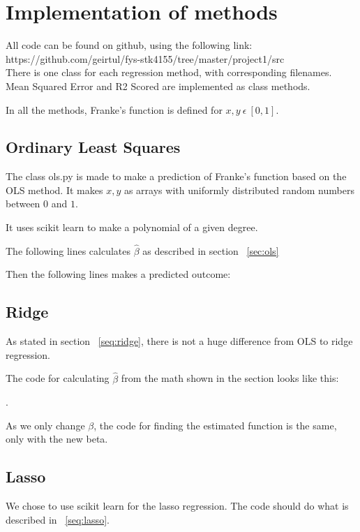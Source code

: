 \section{Implementation of methods}
All code can be found on github, using the following link:\\ 
https://github.com/geirtul/fys-stk4155/tree/master/project1/src\\

There is one class for each regression method, with corresponding 
filenames. Mean Squared Error and R2 Scored are implemented as class methods.

In all the methods, Franke's function is defined for 
\(x,y \ \epsilon \ [0,1]\).

\subsection{Ordinary Least Squares}
The class ols.py is made to make a prediction of Franke's function
based on the OLS method. 
It makes \(x, y\) as arrays with uniformly distributed random numbers 
between \(0\) and \(1\). 

It uses scikit learn to make a polynomial of a given degree. 

The following lines calculates \(\hat{\beta}\) as described in 
section ~\ref{sec:ols} 



Then the following lines makes a predicted outcome:



\subsection{Ridge}
As stated in section ~\ref{seq:ridge}, there is 
not a huge difference from OLS to ridge regression. 

The code for calculating \(\hat{\beta}\) from the math  
shown in the section
looks like this: 

.

As we only change \(\beta\), the code for finding the estimated function 
is the same, only with the new beta. 

\subsection{Lasso}
We chose to use scikit learn for the lasso regression. The code should 
do what is described in ~\ref{seq:lasso}. 

